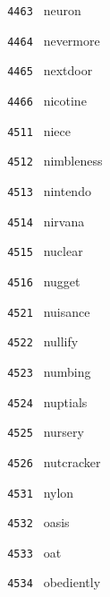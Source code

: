 \documentclass[11pt]{article}
\begin{document}
\begin{multicols}{6}
\noindent \texttt{ 4463 } \hspace{1mm} neuron  \par
\noindent \texttt{ 4464 } \hspace{1mm} nevermore  \par
\noindent \texttt{ 4465 } \hspace{1mm} nextdoor  \par
\noindent \texttt{ 4466 } \hspace{1mm} nicotine  \par
\noindent \texttt{ 4511 } \hspace{1mm} niece  \par
\noindent \texttt{ 4512 } \hspace{1mm} nimbleness  \par
\noindent \texttt{ 4513 } \hspace{1mm} nintendo  \par
\noindent \texttt{ 4514 } \hspace{1mm} nirvana  \par
\noindent \texttt{ 4515 } \hspace{1mm} nuclear  \par
\noindent \texttt{ 4516 } \hspace{1mm} nugget  \par
\noindent \texttt{ 4521 } \hspace{1mm} nuisance  \par
\noindent \texttt{ 4522 } \hspace{1mm} nullify  \par
\noindent \texttt{ 4523 } \hspace{1mm} numbing  \par
\noindent \texttt{ 4524 } \hspace{1mm} nuptials  \par
\noindent \texttt{ 4525 } \hspace{1mm} nursery  \par
\noindent \texttt{ 4526 } \hspace{1mm} nutcracker  \par
\noindent \texttt{ 4531 } \hspace{1mm} nylon  \par
\noindent \texttt{ 4532 } \hspace{1mm} oasis  \par
\noindent \texttt{ 4533 } \hspace{1mm} oat  \par
\noindent \texttt{ 4534 } \hspace{1mm} obediently  \par

\end{multicols}
\end{document}
